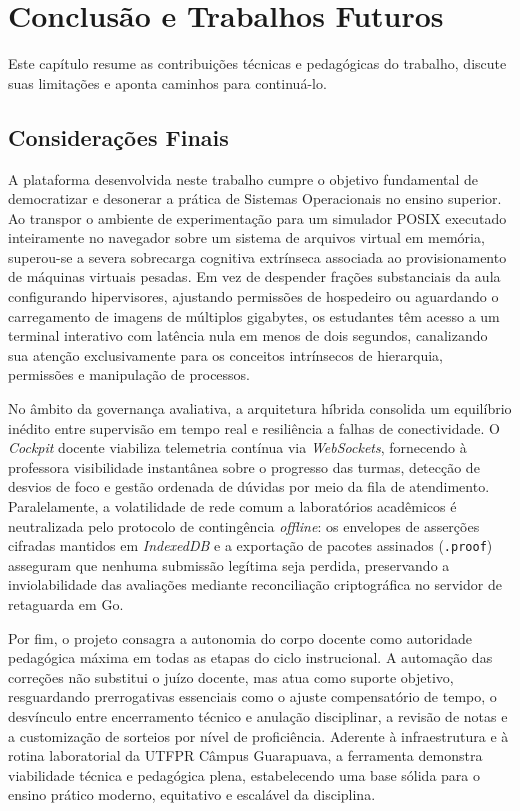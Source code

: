 \chapter{Conclusão e Trabalhos Futuros}
\label{cap:conclusao}

Este capítulo resume as contribuições técnicas e pedagógicas do trabalho, discute suas limitações e aponta caminhos para continuá-lo.

\section{Considerações Finais}
\label{sec:consideracoes-finais}

A plataforma desenvolvida neste trabalho cumpre o objetivo fundamental de democratizar e desonerar a prática de Sistemas Operacionais no ensino superior. Ao transpor o ambiente de experimentação para um simulador POSIX executado inteiramente no navegador sobre um sistema de arquivos virtual em memória, superou-se a severa sobrecarga cognitiva extrínseca associada ao provisionamento de máquinas virtuais pesadas. Em vez de despender frações substanciais da aula configurando hipervisores, ajustando permissões de hospedeiro ou aguardando o carregamento de imagens de múltiplos gigabytes, os estudantes têm acesso a um terminal interativo com latência nula em menos de dois segundos, canalizando sua atenção exclusivamente para os conceitos intrínsecos de hierarquia, permissões e manipulação de processos.

No âmbito da governança avaliativa, a arquitetura híbrida consolida um equilíbrio inédito entre supervisão em tempo real e resiliência a falhas de conectividade. O \textit{Cockpit} docente viabiliza telemetria contínua via \textit{WebSockets}, fornecendo à professora visibilidade instantânea sobre o progresso das turmas, detecção de desvios de foco e gestão ordenada de dúvidas por meio da fila de atendimento. Paralelamente, a volatilidade de rede comum a laboratórios acadêmicos é neutralizada pelo protocolo de contingência \textit{offline}: os envelopes de asserções cifradas mantidos em \textit{IndexedDB} e a exportação de pacotes assinados (\texttt{.proof}) asseguram que nenhuma submissão legítima seja perdida, preservando a inviolabilidade das avaliações mediante reconciliação criptográfica no servidor de retaguarda em Go.

Por fim, o projeto consagra a autonomia do corpo docente como autoridade pedagógica máxima em todas as etapas do ciclo instrucional. A automação das correções não substitui o juízo docente, mas atua como suporte objetivo, resguardando prerrogativas essenciais como o ajuste compensatório de tempo, o desvínculo entre encerramento técnico e anulação disciplinar, a revisão de notas e a customização de sorteios por nível de proficiência. Aderente à infraestrutura e à rotina laboratorial da UTFPR Câmpus Guarapuava, a ferramenta demonstra viabilidade técnica e pedagógica plena, estabelecendo uma base sólida para o ensino prático moderno, equitativo e escalável da disciplina.


